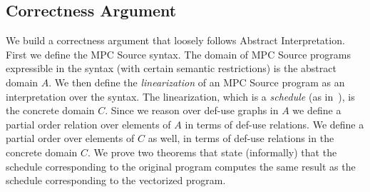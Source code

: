 \begin{algorithmic}

\ENDFOR

\ENDFOR
{}


\end{algorithmic}



\subsection{Correctness Argument}

We build a correctness argument that loosely follows Abstract Interpretation.
First we define the MPC Source syntax. The domain of MPC Source programs
expressible in the syntax (with certain semantic restrictions) is the abstract domain $A$.
We then define the \emph{linearization} of an MPC Source program as an interpretation
over the syntax. The linearization, which is a \emph{schedule} (as in~), is the concrete domain $C$.
Since we reason over def-use graphs in $A$ we define a partial order relation over elements of $A$
in terms of def-use relations. We define a partial order over elements of $C$ as well,
in terms of def-use relations in the concrete domain $C$. We prove two theorems
that state (informally) that the schedule corresponding to the original program computes the same
result as the schedule corresponding to the vectorized program. 

